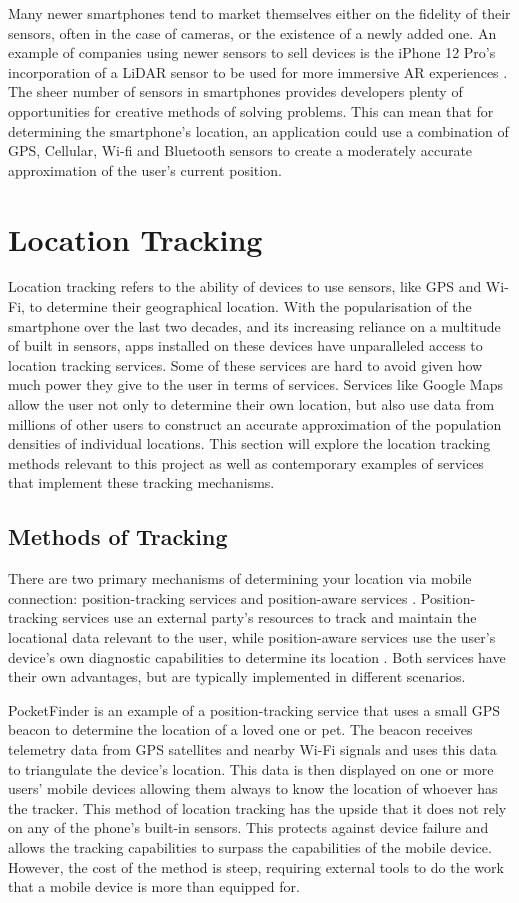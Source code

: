 Many newer smartphones tend to market themselves either on the fidelity of their sensors, often in the case of cameras, or the existence of a newly added one. An example of companies using newer sensors to sell devices is the iPhone 12 Pro's incorporation of a LiDAR sensor to be used for more immersive AR experiences \cite{Stein2020}. The sheer number of sensors in smartphones provides developers plenty of opportunities for creative methods of solving problems. This can mean that for determining the smartphone's location, an application could use a combination of GPS, Cellular, Wi-fi and Bluetooth sensors to create a moderately accurate approximation of the user's current position.

\section{Location Tracking}
Location tracking refers to the ability of devices to use sensors, like GPS and Wi-Fi, to determine their geographical location. With the popularisation of the smartphone over the last two decades, and its increasing reliance on a multitude of built in sensors, apps installed on these devices have unparalleled access to location tracking services. Some of these services are hard to avoid given how much power they give to the user in terms of services. Services like Google Maps allow the user not only to determine their own location, but also use data from millions of other users to construct an accurate approximation of the population densities of individual locations. This section will explore the location tracking methods relevant to this project as well as contemporary examples of services that implement these tracking mechanisms.

\subsection{Methods of Tracking}
There are two primary mechanisms of determining your location via mobile connection: position-tracking services and position-aware services \cite{Barkhuus2003}. Position-tracking services use an external party's resources to track and maintain the locational data relevant to the user, while position-aware services use the user's device's own diagnostic capabilities to determine its location \cite{Barkhuus2003}. Both services have their own advantages, but are typically implemented in different scenarios.  

PocketFinder is an example of a position-tracking service that uses a small GPS beacon to determine the location of a loved one or pet. The beacon receives telemetry data from GPS satellites and nearby Wi-Fi signals and uses this data to triangulate the device's location. This data is then displayed on one or more users' mobile devices allowing them always to know the location of whoever has the tracker. This method of location tracking has the upside that it does not rely on any of the phone's built-in sensors. This protects against device failure and allows the tracking capabilities to surpass the capabilities of the mobile device. However, the cost of the method is steep, requiring external tools to do the work that a mobile device is more than equipped for.

